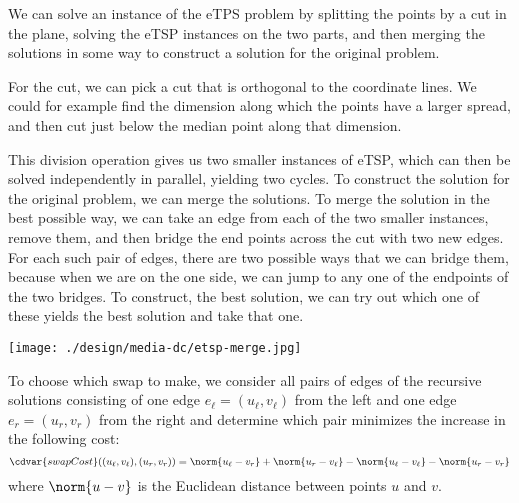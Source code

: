 \begin{cluster}
\label{grp:grm:design::dc::intuition-for-a-divide-and-conquer-algorithm-for-etsp}

\begin{gram}
\label{grm:design::dc::intuition-for-a-divide-and-conquer-algorithm-for-etsp}
We can solve an instance of the eTPS problem by splitting the points
by a cut in the plane, solving the eTSP instances on the two parts,
and then merging the solutions in some way to construct a solution for
the original problem.  

For the cut, we can pick a cut that is orthogonal to the coordinate
lines. We could for example find the dimension along which the points
have a larger spread, and then cut just below the median point along
that dimension.  


This division operation gives us two smaller instances of eTSP, which
can then be solved independently in parallel, yielding two cycles.
To construct the solution for the original problem, we can merge the
solutions.
To merge the solution in the best possible way, we can take an edge
from each of the two smaller instances, remove them, and then bridge
the end points across the cut with two new edges.
For each such pair of edges, there are two possible ways that we can bridge
them, because when we are on the one side, we can jump to any one of
the endpoints of the two bridges. 
To construct, the best solution, we can try out which one of these
yields the best solution and take that one. 

\begin{center}
  \texttt{[image: ./design/media-dc/etsp-merge.jpg]}
\end{center}
To choose which swap to make, we consider all pairs of edges of
the recursive solutions consisting of one edge $e_\ell = (u_\ell,v_\ell)$ from
the left and one edge $e_r = (u_r,v_r)$ from the right and determine which
pair minimizes the increase in the following
cost: 
\[
\cdvar{swapCost}((u_\ell,v_\ell), (u_r,v_r)) =
\norm{u_\ell-v_r} + \norm{u_r-v_\ell} - \norm{u_\ell-v_\ell} -
\norm{u_r-v_r}
\] where $\norm{u-v}$ is the Euclidean distance between
points $u$ and $v$.

\end{gram}
\end{cluster}

